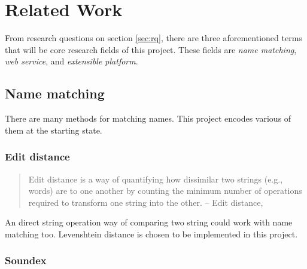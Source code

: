 \chapter{Related Work}
\label{ch:relatedwork}

From research questions on section \ref{sec:rq}, there are three aforementioned
terms that will be core research fields of this project.
These fields are \emph{name matching}, \emph{web service},
and \emph{extensible platform}.

\section{Name matching}

There are many methods for matching names. This project encodes
various of them at the starting state.

\subsection{Edit distance}

\begin{quotation} \noindent
Edit distance is a way of quantifying how dissimilar two strings
(e.g., words) are to one another by counting the minimum number
of operations required to transform one string into the other.
-- Edit distance, \citet{editdistance}
\end{quotation}

\noindent An direct string operation way of comparing two string
could work with name matching too. Levenshtein distance \citep{levenshteindistance}
is chosen to be implemented in this project.


\subsection{Soundex}


